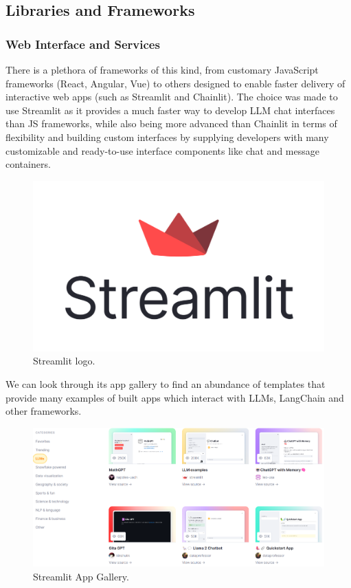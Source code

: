 \subsection{Libraries and Frameworks}
\subsubsection*{Web Interface and Services}
There is a plethora of frameworks of this kind, from customary JavaScript frameworks (React, Angular, Vue) to others designed to enable faster delivery of interactive web apps (such as Streamlit and Chainlit).\newline
The choice was made to use Streamlit as it provides a much faster way to develop LLM chat interfaces than JS frameworks, while also being more advanced than Chainlit in terms of flexibility and building custom interfaces by supplying developers with many customizable and ready-to-use interface components like chat and message containers.
\begin{figure}[H]
    \centering
    \includegraphics[width=.5\linewidth]{./figures/streamlit-logo.png}
    \caption{Streamlit logo.}
\end{figure}
We can look through its app gallery to find an abundance of templates that provide many examples of built apps which interact with LLMs, LangChain and other frameworks.
\begin{figure}[H]
    \centering
    \includegraphics[width=\linewidth]{./figures/streamlit-app-gallery.png}
    \caption{Streamlit App Gallery.}
\end{figure}
